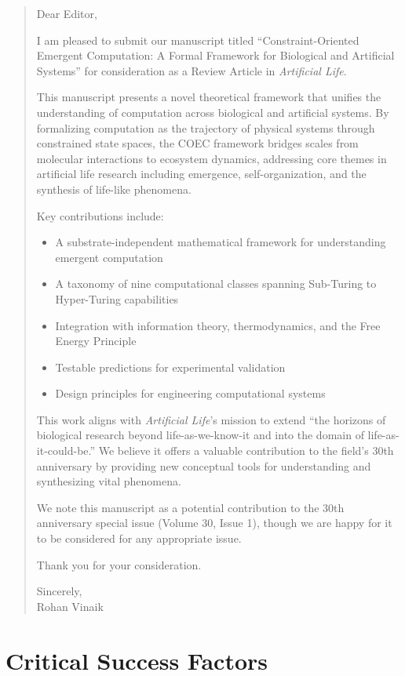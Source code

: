 \documentclass[11pt]{article}
\begin{document}
\begin{quote}
Dear Editor,

I am pleased to submit our manuscript titled ``Constraint-Oriented Emergent Computation: A Formal Framework for Biological and Artificial Systems'' for consideration as a Review Article in \textit{Artificial Life}.

This manuscript presents a novel theoretical framework that unifies the understanding of computation across biological and artificial systems. By formalizing computation as the trajectory of physical systems through constrained state spaces, the COEC framework bridges scales from molecular interactions to ecosystem dynamics, addressing core themes in artificial life research including emergence, self-organization, and the synthesis of life-like phenomena.

Key contributions include:
\begin{itemize}
    \item A substrate-independent mathematical framework for understanding emergent computation
    \item A taxonomy of nine computational classes spanning Sub-Turing to Hyper-Turing capabilities
    \item Integration with information theory, thermodynamics, and the Free Energy Principle
    \item Testable predictions for experimental validation
    \item Design principles for engineering computational systems
\end{itemize}

This work aligns with \textit{Artificial Life}'s mission to extend ``the horizons of biological research beyond life-as-we-know-it and into the domain of life-as-it-could-be.'' We believe it offers a valuable contribution to the field's 30th anniversary by providing new conceptual tools for understanding and synthesizing vital phenomena.

We note this manuscript as a potential contribution to the 30th anniversary special issue (Volume 30, Issue 1), though we are happy for it to be considered for any appropriate issue.

Thank you for your consideration.

Sincerely,\\
Rohan Vinaik
\end{quote}

\section{Critical Success Factors}
\end{document}
